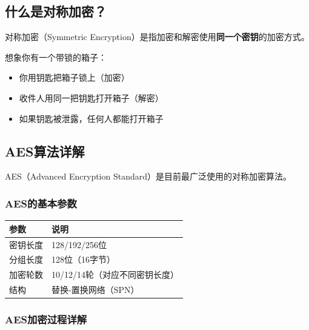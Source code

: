 \documentclass[12pt,a4paper]{article}
\begin{document}
\subsection{什么是对称加密？}

对称加密（Symmetric Encryption）是指加密和解密使用\textbf{同一个密钥}的加密方式。

\begin{examplebox}[生活实例]
想象你有一个带锁的箱子：
\begin{itemize}
\item 你用钥匙把箱子锁上（加密）
\item 收件人用同一把钥匙打开箱子（解密）
\item 如果钥匙被泄露，任何人都能打开箱子
\end{itemize}
\end{examplebox}

\subsection{AES算法详解}

AES（Advanced Encryption Standard）是目前最广泛使用的对称加密算法。

\subsubsection{AES的基本参数}

\begin{center}
\begin{tabular}{|l|l|}
\hline
\textbf{参数} & \textbf{说明} \\
\hline
密钥长度 & 128/192/256位 \\
\hline
分组长度 & 128位（16字节） \\
\hline
加密轮数 & 10/12/14轮（对应不同密钥长度） \\
\hline
结构 & 替换-置换网络（SPN） \\
\hline
\end{tabular}
\end{center}

\subsubsection{AES加密过程详解}
\end{document}
